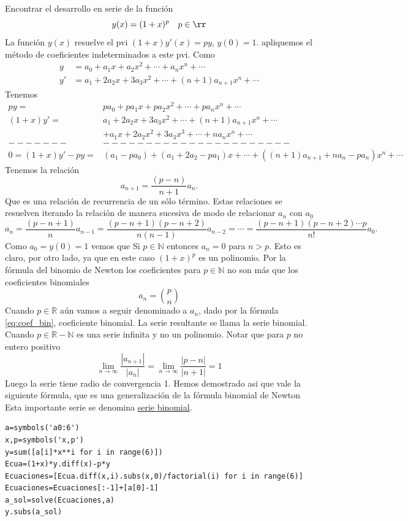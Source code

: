 \begin{ejemplo}{}  Encontrar el desarrollo en serie de la función
\[y(x)=(1+x)^p\quad p\in\rr\]
La función $y(x)$ resuelve el pvi  $(1+x)y'(x)=py$, $y(0)=1$. apliquemos el método de coeficientes indeterminados a este pvi.
Como
\[\begin{split}
   y&=a_0+a_1x+a_2x^2+\cdots+a_nx^n+\cdots\\
   y'&=a_1+2a_2x+3a_3x^2+\cdots+(n+1)a_{n+1}x^n+\cdots
  \end{split}
\]
Tenemos
\[\begin{split}
   py=&pa_0+pa_1x+pa_2x^2+\cdots+pa_nx^n+\cdots\\
  (1+x)y'=&a_1+2a_2x+3a_3x^2+\cdots+(n+1)a_{n+1}x^n+\cdots\\
          &+a_1x+2a_2x^2+3a_3x^3+\cdots+na_{n}x^n+\cdots\\
-------&----------------------\\
0=(1+x)y'-py =& (a_1-pa_0)+(a_1+2a_2-pa_1)x+\cdots +((n+1)a_{n+1}+na_n-pa_n)x^n+\cdots
  \end{split}
\]
Tenemos la relación
\[ a_{n+1}=\frac{(p-n)}{n+1}a_n.
\]
Que es una relación de recurrencia de un sólo término. Estas relaciones se resuelven iterando la relación de manera sucesiva de modo de relacionar $a_n$ con $a_0$
\[a_n=\frac{(p-n+1)}{n}a_{n-1}=\frac{(p-n+1)(p-n+2)}{n(n-1)}a_{n-2}=\cdots=\frac{(p-n+1)(p-n+2)\cdots p}{n!}a_0.\]
Como $a_0=y(0)=1$ vemos que
Si $p\in\mathbb{N}$ entonces $a_n=0$ para $n>p$. Esto es claro, por otro lado, ya que en este caso $(1+x)^p$ es un polinomio. Por la fórmula del binomio de Newton los coeficientes para $p\in \mathbb{N}$  no son más que los coeficientes binomiales
\[a_n=\binom{p}{n}\]
 Cuando $p\in\mathbb{R}$ aún vamos a seguir denominado a $a_n$, dado por la fórmula \eqref{eq:coef_bin},   coeficiente binomial. La serie resultante se llama la serie binomial. Cuando $p\in\mathbb{R}-\mathbb{N}$ es una serie infinita y no  un polinomio. Notar que para $p$ no entero positivo
\[\lim\limits_{n\to\infty}\frac{|a_{n+1}|}{|a_n|}=\lim\limits_{n\to\infty}\frac{|p-n|}{|n+1|}=1\]
Luego la serie tiene radio de convergencia 1.  Hemos demostrado asi que vale la siguiente fórmula, que es una generalización de la fórmula binomial de Newton
Esta importante serie se denomina \href{http://en.wikipedia.org/wiki/Binomial_series}{serie binomial}.


\begin{lstlisting}
a=symbols('a0:6')
x,p=symbols('x,p')
y=sum([a[i]*x**i for i in range(6)])
Ecua=(1+x)*y.diff(x)-p*y
Ecuaciones=[Ecua.diff(x,i).subs(x,0)/factorial(i) for i in range(6)]
Ecuaciones=Ecuaciones[:-1]+[a[0]-1]
a_sol=solve(Ecuaciones,a)
y.subs(a_sol)
\end{lstlisting}




\end{ejemplo}

